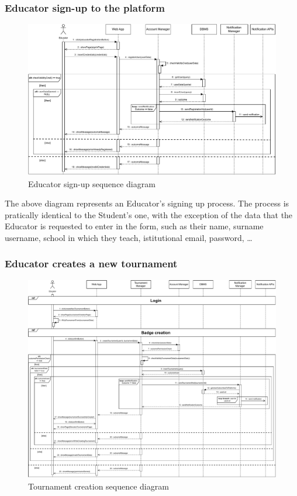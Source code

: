 \documentclass{article}
\begin{document}
{    \subsubsection{Educator sign-up to the platform}
        \begin{figure}[H]
            \centering
            \hspace*{-2.2cm}\includegraphics[scale=0.65]{Sequence/Sequence2DD.pdf}
            \caption{Educator sign-up sequence diagram}
            \label{fig:Sequence2DD}
        \end{figure}

        The above diagram represents an Educator's signing up process.
        The process is pratically identical to the Student's one, with the exception of the
        data that the Educator is requested to enter in the form, such as their name, surname
        username, school in which they teach, istitutional email, password, \dots 

    \subsubsection{Educator creates a new tournament}
        \begin{figure}[H]
            \centering
            \hspace*{-4cm}\includegraphics[scale=0.65]{Sequence/Sequence3DD.pdf}
            \caption{Tournament creation sequence diagram}
            \label{fig:Sequence3DD}
        \end{figure}

}
\end{document}
